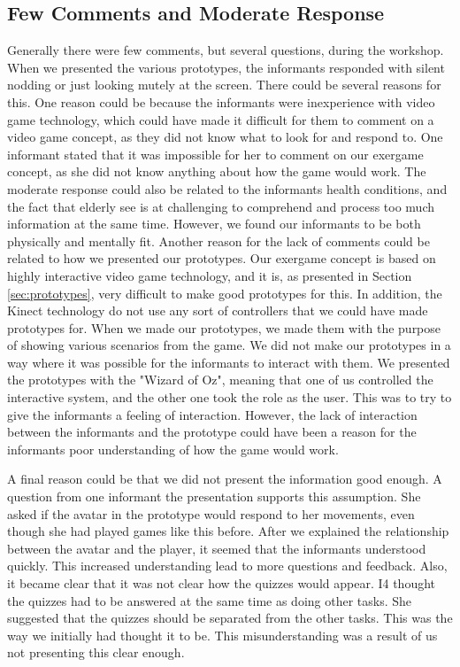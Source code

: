 \subsection{Few Comments and Moderate Response}
Generally there were few comments, but several questions, during the workshop. When we presented the various prototypes, the informants responded with silent nodding or just looking mutely at the screen. There could be several reasons for this. One reason could be because the informants were inexperience with video game technology, which could have made it difficult for them to comment on a video game concept, as they did not know what to look for and respond to. One informant stated that it was impossible for her to comment on our exergame concept, as she did not know anything about how the game would work. The moderate response could also be related to the informants health conditions, and the fact that elderly see is at challenging to comprehend and process too much information at the same time. However, we found our informants to be both physically and mentally fit. Another reason for the lack of comments could be related to how we presented our prototypes. Our exergame concept is based on highly interactive video game technology, and it is, as presented in Section \ref{sec:prototypes}, very difficult to make good prototypes for this. In addition, the Kinect technology do not use any sort of controllers that we could have made prototypes for. When we made our prototypes, we made them with the purpose of showing various scenarios from the game. We did not make our prototypes in a way where it was possible for the informants to interact with them. We presented the prototypes with the "Wizard of Oz", meaning that one of us controlled the interactive system, and the other one took the role as the user. This was to try to give the informants a feeling of interaction. However, the lack of interaction between the informants and the prototype could have been a reason for the informants poor understanding of how the game would work. 

A final reason could be that we did not present the information good enough. A question from one informant the presentation supports this assumption. She asked if the avatar in the prototype would respond to her movements, even though she had played games like this before. After we explained the relationship between the avatar and the player, it seemed that the informants understood quickly. This increased understanding lead to more questions and feedback. Also, it became clear that it was not clear how the quizzes would appear. I4 thought the quizzes had to be answered at the same time as doing other tasks. She suggested that the quizzes should be separated from the other tasks. This was the way we initially had thought it to be. This misunderstanding was a result of us not presenting this clear enough.

